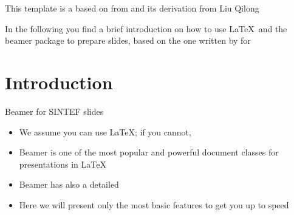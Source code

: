\begin{frame}

This template is a based on  from  and its derivation  from Liu Qilong

\vspace{\baselineskip}

In the following you find a brief introduction on how to use \LaTeX\ and the beamer package to prepare slides, based on the one written by  for 


\end{frame}

\section{Introduction}

\begin{frame}{Beamer for SINTEF slides}
\begin{itemize}
\item We assume you can use \LaTeX; if you cannot,
\item Beamer is one of the most popular and powerful document
classes for presentations in \LaTeX
\item Beamer has also a detailed
\item Here we will present only the most basic features to get you up to speed
\end{itemize}
\end{frame}

